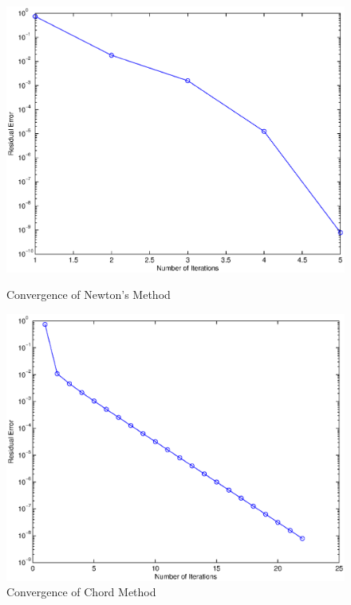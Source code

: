 \documentclass[paper=a4, fontsize=11pt]{scrartcl} %
\numberwithin{equation}{section} %
\numberwithin{figure}{section} %
\numberwithin{table}{section} %
\begin{document}
\iffalse
\begin{figure}[H]
\begin{minipage}{0.5\textwidth}
\centerline{\includegraphics [scale = 0.4] {newtonfig.eps}}
\caption{Convergence of Newton's Method}
\end{minipage}
\begin{minipage}{0.5\textwidth}
\centerline{\includegraphics [scale = 0.4] {chordfig.eps}}
\caption{Convergence of Chord Method}
\end{minipage}
\end{figure}
\end{document}
